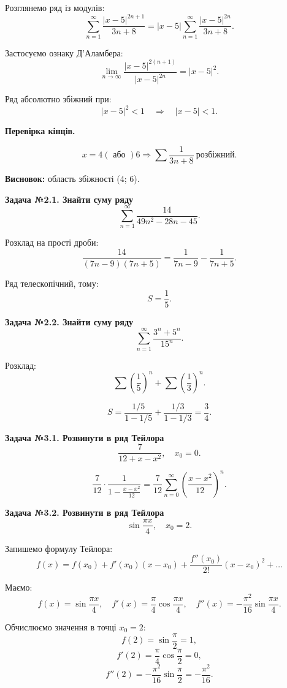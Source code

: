 \documentclass[12pt,a4paper]{article}
\begin{document}
Розглянемо ряд із модулів:
\[
\sum_{n=1}^{\infty}\frac{|x-5|^{2n+1}}{3n+8}
=|x-5|\sum_{n=1}^{\infty}\frac{|x-5|^{2n}}{3n+8}.
\]

Застосуємо ознаку Д’Аламбера:
\[
\lim_{n\to\infty}\frac{|x-5|^{2(n+1)}}{|x-5|^{2n}}=|x-5|^2.
\]

Ряд абсолютно збіжний при:
\[
|x-5|^2<1\quad\Rightarrow\quad|x-5|<1.
\]

\textbf{Перевірка кінців.}

\[
x=4 (\text{ або }) 6\Rightarrow\sum\frac{1}{3n+8}\ \text{розбіжний}.
\]

\textbf{Висновок:} область збіжності (4; 6).

\vspace{1em}

\textbf{Задача №2.1. Знайти суму ряду}
\[
\sum_{n=1}^{\infty}\frac{14}{49n^2-28n-45}.
\]

Розклад на прості дроби:
\[
\frac{14}{(7n-9)(7n+5)}=\frac{1}{7n-9}-\frac{1}{7n+5}.
\]

Ряд телескопічний, тому:
\[
S=\frac{1}{5}.
\]

\textbf{Задача №2.2. Знайти суму ряду}
\[
\sum_{n=1}^{\infty}\frac{3^n+5^n}{15^n}.
\]

Розклад:
\[
\sum\left(\frac15\right)^n+\sum\left(\frac13\right)^n.
\]

\[
S=\frac{1/5}{1-1/5}+\frac{1/3}{1-1/3}=\frac34.
\]

\textbf{Задача №3.1. Розвинути в ряд Тейлора}
\[
\frac{7}{12+x-x^2},\quad x_0=0.
\]

\[
\frac{7}{12}\cdot\frac{1}{1-\frac{x-x^2}{12}}
=\frac{7}{12}\sum_{n=0}^{\infty}\left(\frac{x-x^2}{12}\right)^n.
\]

\textbf{Задача №3.2. Розвинути в ряд Тейлора}
\[
\sin\frac{\pi x}{4}, \quad x_0=2.
\]

Запишемо формулу Тейлора:
\[
f(x)=f(x_0)+f'(x_0)(x-x_0)+\frac{f''(x_0)}{2!}(x-x_0)^2+\dots
\]

Маємо:
\[
f(x)=\sin\frac{\pi x}{4},
\quad
f'(x)=\frac{\pi}{4}\cos\frac{\pi x}{4},
\quad
f''(x)=-\frac{\pi^2}{16}\sin\frac{\pi x}{4}.
\]

Обчислюємо значення в точці \(x_0=2\):
\[
f(2)=\sin\frac{\pi}{2}=1,
\]
\[
f'(2)=\frac{\pi}{4}\cos\frac{\pi}{2}=0,
\]
\[
f''(2)=-\frac{\pi^2}{16}\sin\frac{\pi}{2}
=-\frac{\pi^2}{16}.
\]
\end{document}
